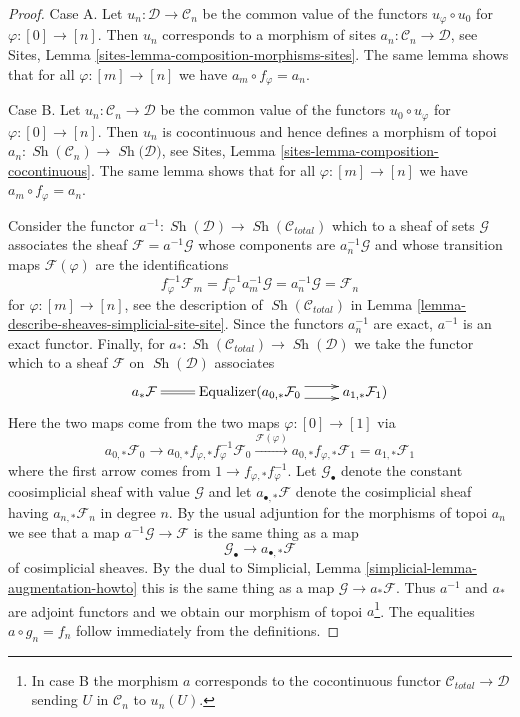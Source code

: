 \documentclass{stacks-project}
\theoremstyle{plain}
\theoremstyle{definition}
\theoremstyle{remark}
\numberwithin{equation}{subsection}
\def\Sh{\mathop{\mathit{Sh}}\nolimits}
\begin{document}
\begin{proof}
Case A. Let $u_n : \mathcal{D} \to \mathcal{C}_n$ be the common
value of the functors $u_\varphi \circ u_0$ for $\varphi : [0] \to [n]$.
Then $u_n$ corresponds to a morphism of sites
$a_n : \mathcal{C}_n \to \mathcal{D}$, see
Sites, Lemma \ref{sites-lemma-composition-morphisms-sites}.
The same lemma shows that for all $\varphi : [m] \to [n]$ we have
$a_m \circ f_\varphi = a_n$.

\medskip\noindent
Case B. Let $u_n : \mathcal{C}_n \to \mathcal{D}$ be the common
value of the functors $u_0 \circ u_\varphi$ for $\varphi : [0] \to [n]$.
Then $u_n$ is cocontinuous and hence defines a morphism of topoi
$a_n : \Sh(\mathcal{C}_n) \to \Sh(\mathcal{D)}$, see
Sites, Lemma \ref{sites-lemma-composition-cocontinuous}.
The same lemma shows that for all $\varphi : [m] \to [n]$ we have
$a_m \circ f_\varphi = a_n$.

\medskip\noindent
Consider the functor $a^{-1} : \Sh(\mathcal{D}) \to \Sh(\mathcal{C}_{total})$
which to a sheaf of sets $\mathcal{G}$ associates the sheaf
$\mathcal{F} = a^{-1}\mathcal{G}$ whose components are $a_n^{-1}\mathcal{G}$
and whose transition maps $\mathcal{F}(\varphi)$ are the identifications
$$
f_\varphi^{-1}\mathcal{F}_m =
f_\varphi^{-1} a_m^{-1}\mathcal{G} =
a_n^{-1}\mathcal{G} =
\mathcal{F}_n
$$
for $\varphi : [m] \to [n]$, see the description of
$\Sh(\mathcal{C}_{total})$ in
Lemma \ref{lemma-describe-sheaves-simplicial-site-site}.
Since the functors $a_n^{-1}$ are exact, $a^{-1}$ is an exact functor.
Finally, for $a_* : \Sh(\mathcal{C}_{total}) \to \Sh(\mathcal{D})$
we take the functor which to a sheaf $\mathcal{F}$ on $\Sh(\mathcal{D})$
associates
$$
\xymatrix{
a_*\mathcal{F} \ar@{=}[r] &
\text{Equalizer}(a_{0, *}\mathcal{F}_0
\ar@<1ex>[r] \ar@<-1ex>[r] &
a_{1, *}\mathcal{F}_1)
}
$$
Here the two maps come from the two maps $\varphi : [0] \to [1]$
via
$$
a_{0, *}\mathcal{F}_0 \to
a_{0, *}f_{\varphi, *} f_\varphi^{-1}\mathcal{F}_0
\xrightarrow{\mathcal{F}(\varphi)}
a_{0, *}f_{\varphi, *} \mathcal{F}_1 = a_{1, *}\mathcal{F}_1
$$
where the first arrow comes from $1 \to f_{\varphi, *} f_\varphi^{-1}$.
Let $\mathcal{G}_\bullet$ denote the constant coosimplicial sheaf
with value $\mathcal{G}$ and let $a_{\bullet, *}\mathcal{F}$
denote the cosimplicial sheaf having $a_{n, *}\mathcal{F}_n$ in degree $n$.
By the usual adjuntion for the morphisms of topoi $a_n$ we see that
a map $a^{-1}\mathcal{G} \to \mathcal{F}$
is the same thing as a map
$$
\mathcal{G}_\bullet \longrightarrow a_{\bullet, *}\mathcal{F}
$$
of cosimplicial sheaves.
By the dual to Simplicial, Lemma \ref{simplicial-lemma-augmentation-howto}
this is the same thing as a map $\mathcal{G} \to a_*\mathcal{F}$.
Thus $a^{-1}$ and $a_*$ are adjoint functors and we obtain
our morphism of topoi $a$\footnote{In case B the morphism $a$
corresponds to the cocontinuous functor
$\mathcal{C}_{total} \to \mathcal{D}$ sending
$U$ in $\mathcal{C}_n$ to $u_n(U)$.}. The equalities
$a \circ g_n = f_n$ follow immediately from the definitions.
\end{proof}
\end{document}
